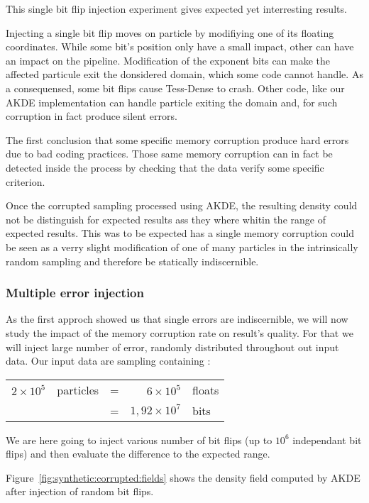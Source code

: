 \documentclass[10pt,a4paper,twoside,twocolumn]{article}
\begin{document}
This single bit flip injection experiment gives expected yet interresting
results.

Injecting a single bit flip moves on particle by modifiying one of its floating
coordinates. While some bit's position only have a small impact, other can have
an impact on the pipeline. Modification of the exponent bits can make the
affected particule exit the donsidered domain, which some code cannot handle.
As a consequensed, some bit flips cause Tess-Dense to crash. Other code, like
our AKDE implementation can handle particle exiting the domain and, for such
corruption in fact produce silent errors.

The first conclusion that some specific memory corruption produce hard errors
due to bad coding practices. Those same memory corruption can in fact be
detected inside the process by checking that the data verify some specific
criterion.

Once the corrupted sampling processed using AKDE, the resulting density could
not be distinguish for expected results ass they where whitin the range of
expected results. This was to be expected has a single memory corruption could
be seen as a verry slight modification of one of many particles in the
intrinsically random sampling and therefore be statically indiscernible.

\subsubsection{Multiple error injection}

As the first approch showed us that single errors are indiscernible, we will now
study the impact of the memory corruption rate on result's quality. For that we
will inject large number of error, randomly distributed throughout out input
data. Our input data are sampling containing :
\begin{table}[!h]
	\centering
	\begin{tabular}{rlcrl}
		$2\times10^5$	& particles	&=	& $6\times10^5$			& floats	\\
									&						&=	& $1,92\times10^7$	& bits
	\end{tabular}
\end{table}
We are here going to inject various number of bit flips (up to $10^6$
independant bit flips) and then evaluate the difference to the expected range.

Figure~\ref{fig:synthetic:corrupted:fields} shows the density field computed by AKDE after
injection of random bit flips.
\end{document}
